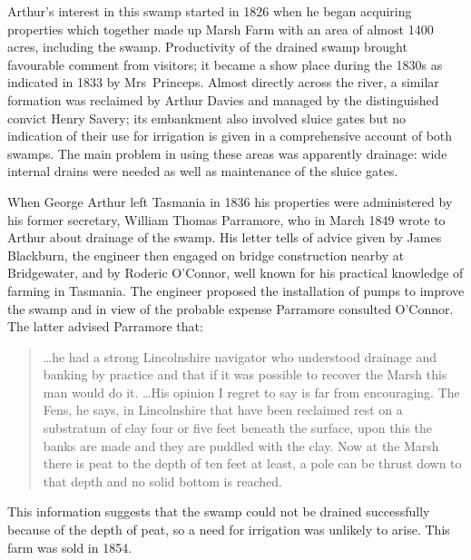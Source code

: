 Arthur's interest in this swamp started in 1826 when he began
acquiring properties which together made up Marsh Farm with an area of
almost 1400\,acres, including the swamp.  Productivity of the drained
swamp brought favourable comment from visitors; it became a show place
during the 1830s as indicated in 1833 by Mrs~Princeps.  Almost
directly across the river, a similar formation was reclaimed by Arthur
Davies and managed by the distinguished convict
Henry Savery; its embankment also involved sluice
gates but no indication of their use for irrigation is given in a
comprehensive account of both swamps.  The main problem in using these
areas was apparently drainage: wide internal drains were needed as
well as maintenance of the sluice gates.

When George Arthur left Tasmania in 1836 his properties were
administered by his former secretary, William Thomas
Parramore, who in March 1849 wrote to Arthur
about drainage of the swamp.  His letter tells of advice given by
James Blackburn, the engineer then engaged on
bridge construction nearby at Bridgewater, and by Roderic
O'Connor,  well known for his practical knowledge
of farming in Tasmania.  The engineer proposed the installation of
pumps to improve the swamp and in view of the probable expense
Parramore consulted O'Connor.  The latter advised Parramore that:
\begin{quote}
	\ldots he had a strong Lincolnshire navigator who understood
	drain\-age and banking by practice and that if it was possible
	to recover the Marsh this man would do it. \ldots His opinion
	I regret to say is far from encouraging.  The Fens, he says,
	in Lincolnshire that have been reclaimed rest on a substratum
	of clay four or five feet beneath the surface, upon this the
	banks are made and they are puddled with the clay.  Now at the
	Marsh there is peat to the depth of ten feet at least, a pole
	can be thrust down to that depth and no solid bottom is
	reached.
\end{quote}
This information suggests that the swamp could not be drained
successfully because of the depth of peat, so a need for irrigation
was unlikely to arise.  This farm was sold in 1854.

